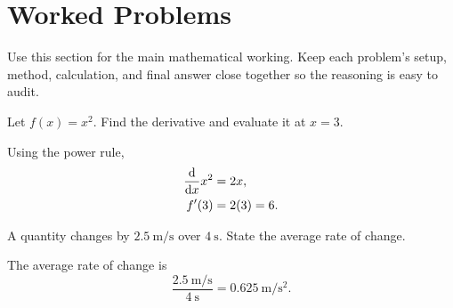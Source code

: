 \section{Worked Problems}

Use this section for the main mathematical working. Keep each problem's setup,
method, calculation, and final answer close together so the reasoning is easy
to audit.

\begin{problem}
Let \(f(x)=x^2\). Find the derivative and evaluate it at \(x=3\).
\end{problem}

\begin{solution}
Using the power rule,
\begin{align}
    \frac{\mathop{}\!\mathrm{d} }{\mathop{}\!\mathrm{d} x} x^2 &= 2x, \\
    f'(3) &= 2(3)=6.
\end{align}

\end{solution}

\begin{problem}
A quantity changes by \(\SI{2.5}{\metre\per\second}\) over
\(\SI{4}{\second}\). State the average rate of change.
\end{problem}

\begin{solution}
The average rate of change is
\begin{equation}
    \frac{\SI{2.5}{\metre\per\second}}{\SI{4}{\second}}
    = \SI{0.625}{\metre\per\second\squared}.
\end{equation}

\end{solution}
